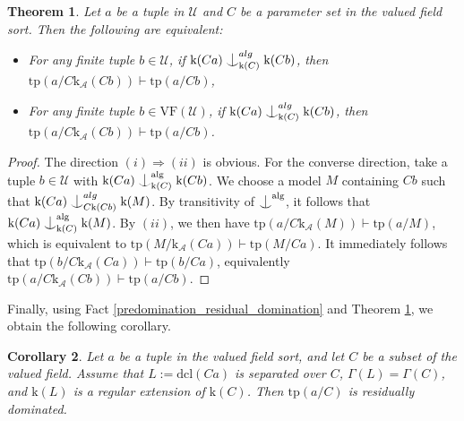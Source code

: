 \documentclass[12pt]{article}
\newcommand{\tpp}{\mathrm{tp}}
\newcommand{\dcl}{\mathrm{dcl}}
\newcommand{\alg}{\mathrm{alg}}
\newcommand{\0}{\emptyset}
\newcommand{\vf}{\mathrm{VF}}
\newcommand{\rf}{\mathrm{k}}
\newcommand{\A}{\mathcal{A}}
\newcommand{\U}{\mathcal{U}}
\def\forkindep{\mathrel{\raise0.2ex\hbox{\ooalign{\hidewidth$\vert$\hidewidth\cr\raise-0.9ex\hbox{$\smile$}}}}}
\theoremstyle{plain}%
\newtheorem{thm}{Theorem}[section]
\newtheorem{cor}[thm]{Corollary}
\theoremstyle{definition}
\theoremstyle{remark}
\begin{document}

\begin{thm}\label{resolution_full} Let $a$ be a tuple in $\U
$ and $C$ be a parameter set in the valued field sort. Then the following are equivalent:
\begin{itemize}
\item[(i)] For any finite tuple $b\in\U$, if $\rf(Ca)\forkindep_{\rf(C)}^{alg}\rf(Cb)$, then $\tpp(a/C\rf_{\mathcal{A}}(Cb))\vdash\tpp(a/Cb)$,
\item[(ii)] For any finite tuple $b\in \vf(\U)$, if $\rf(Ca)\forkindep_{\rf(C)}^{alg}\rf(Cb)$, then $\tpp(a/C\rf_{\mathcal{A}}(Cb))\vdash\tpp(a/Cb)$.
\end{itemize}

\end{thm} 

\begin{proof} The direction $(i) \Rightarrow (ii)$ is obvious. 
For the converse direction, take a tuple $b \in \U$ with $\rf(Ca) \forkindep_{\rf(C)}^{\alg} \rf(Cb)$. 
We choose a model $M$ containing $Cb$ such that $\rf(Ca) \forkindep_{C \rf(Cb)}^{alg} \rf(M)$. By transitivity of $\forkindep^{\alg}$, it follows that $\rf(Ca) \forkindep_{\rf(C)}^{\alg} \rf(M)$. By $(ii)$, we then have $\tpp(a / C \rf_{\mathcal{A}}(M)) \vdash \tpp(a / M)$, which is equivalent to $\tpp(M / \rf_{\mathcal{A}}(Ca)) \vdash \tpp(M / Ca)$. 
It immediately follows that $\tpp(b / C \rf_{\mathcal{A}}(Ca)) \vdash \tpp(b / Ca)$, equivalently $\tpp(a / C \rf_{\mathcal{A}}(Cb)) \vdash \tpp(a / Cb)$.\end{proof}
Finally, using Fact \ref{predomination_residual_domination} and Theorem \ref{resolution_full}, we obtain the following corollary.

\begin{cor}\label{full_residual_domination} Let $a$ be a tuple in the valued field sort, and let $C$ be a subset of the valued field. Assume that $L:=\dcl(Ca)$ is separated over $C$, $\Gamma(L)=\Gamma(C)$, and $\rf(L)$ is a regular extension of $\rf(C)$. Then  $\tpp(a/C)$ is residually dominated. \end{cor}
\end{document}
